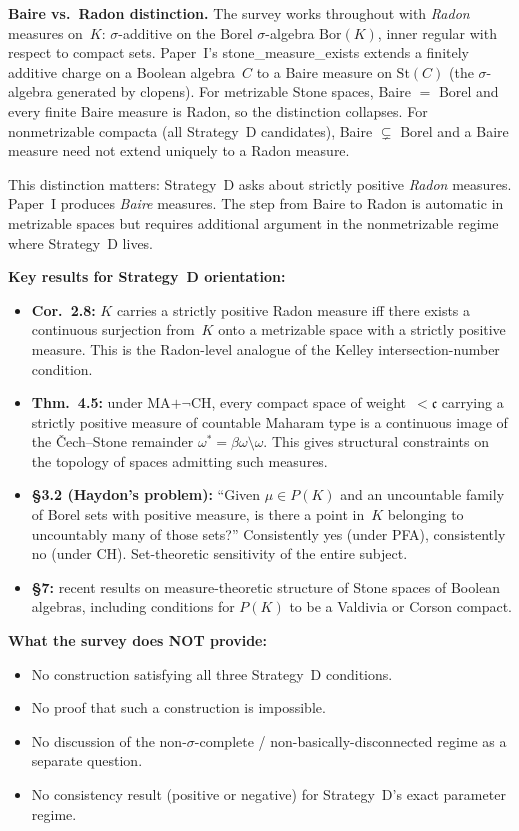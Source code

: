 \medskip\noindent
\textbf{Baire vs.\ Radon distinction.}  The survey works throughout
with \emph{Radon} measures on~$K$: $\sigma$-additive on the Borel
$\sigma$-algebra $\text{Bor}(K)$, inner regular with respect to
compact sets.  Paper~I's stone\_measure\_exists extends a finitely
additive charge on a Boolean algebra~$C$ to a Baire measure on
$\text{St}(C)$ (the $\sigma$-algebra generated by clopens).  For
metrizable Stone spaces, Baire $=$ Borel and every finite Baire
measure is Radon, so the distinction collapses.  For nonmetrizable
compacta (all Strategy~D candidates), Baire $\subsetneq$ Borel and a
Baire measure need not extend uniquely to a Radon measure.

This distinction matters: Strategy~D asks about strictly positive
\emph{Radon} measures.  Paper~I produces \emph{Baire} measures.  The
step from Baire to Radon is automatic in metrizable spaces but
requires additional argument in the nonmetrizable regime where
Strategy~D lives.

\medskip\noindent
\textbf{Key results for Strategy~D orientation:}
\begin{itemize}[nosep]
  \item \textbf{Cor.~2.8:} $K$ carries a strictly positive Radon
    measure iff there exists a continuous surjection from~$K$ onto a
    metrizable space with a strictly positive measure.  This is the
    Radon-level analogue of the Kelley intersection-number condition.
  \item \textbf{Thm.~4.5:} under MA$+\neg$CH, every compact space of
    weight~$< \mathfrak{c}$ carrying a strictly positive measure of
    countable Maharam type is a continuous image of the \v{C}ech--Stone
    remainder $\omega^* = \beta\omega \setminus \omega$.  This gives
    structural constraints on the topology of spaces admitting such
    measures.
  \item \textbf{\S 3.2 (Haydon's problem):} ``Given $\mu \in P(K)$
    and an uncountable family of Borel sets with positive measure, is
    there a point in~$K$ belonging to uncountably many of those
    sets?''  Consistently yes (under PFA), consistently no (under CH).
    Set-theoretic sensitivity of the entire subject.
  \item \textbf{\S 7:} recent results on measure-theoretic structure
    of Stone spaces of Boolean algebras, including conditions for
    $P(K)$ to be a Valdivia or Corson compact.
\end{itemize}

\medskip\noindent
\textbf{What the survey does NOT provide:}
\begin{itemize}[nosep]
  \item No construction satisfying all three Strategy~D conditions.
  \item No proof that such a construction is impossible.
  \item No discussion of the non-$\sigma$-complete / non-basically-disconnected
    regime as a separate question.
  \item No consistency result (positive or negative) for Strategy~D's
    exact parameter regime.
\end{itemize}

